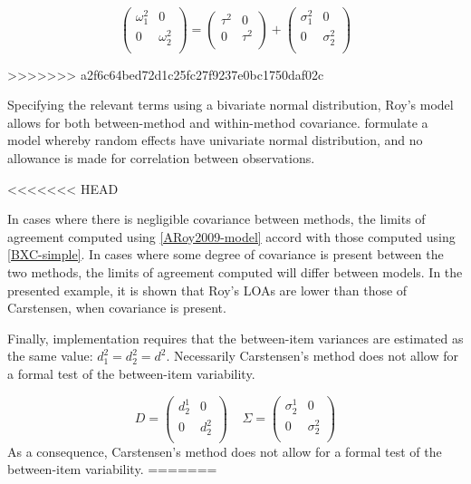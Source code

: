 \documentclass[12pt, a4paper]{report}
\theoremstyle{plain}
\theoremstyle{definition}
\theoremstyle{remark}
\begin{document}
\[\left(\begin{array}{cc}
\omega^2_1  & 0 \\
0 & \omega^2_2 \\
\end{array}  \right)
=  \left(
\begin{array}{cc}
\tau^2  & 0 \\
0 & \tau^2 \\
\end{array} \right)+
\left(
\begin{array}{cc}
\sigma^2_1  & 0 \\
0 & \sigma^2_2 \\
\end{array}\right)
\]

>>>>>>> a2f6c64bed72d1c25fc27f9237e0bc1750daf02c

Specifying the relevant terms using a bivariate normal distribution, Roy's model allows for both between-method and within-method covariance. \citet{BXC2008} formulate a model whereby random effects have univariate normal distribution, and no allowance is made for correlation between observations.

<<<<<<< HEAD



In cases where there is negligible covariance between methods, the limits of agreement computed using \ref{ARoy2009-model} accord with those computed using \ref{BXC-simple}. In cases where some degree of covariance is present between the two methods, the limits of agreement computed will differ between models. In the presented example, it is shown that Roy's LOAs are lower than those of Carstensen, when covariance is present.

Finally, implementation requires that the between-item variances are estimated as the same value: $d^2_1 = d^2_2 = d^2$. Necessarily Carstensen's method does not allow for a formal test of the between-item variability.




\[{D} = \left(
\begin{array}{cc}
d^1_2  & 0 \\
0 & d^2_2 \\
\end{array}
\right) \;\;\;\; {\Sigma} = \left(
\begin{array}{cc}
\sigma^1_2  & 0 \\
0 & \sigma^2_2 \\
\end{array}
\right) \]
As a consequence, Carstensen's method does not allow for a formal test of the between-item variability.
=======
\end{document}
